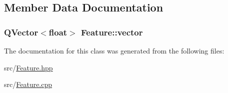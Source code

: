 \subsection{Member Data Documentation}
\hypertarget{class_feature_a8158dfca752942aeb84f35c363184d95}{
\subsubsection[{vector}]{\setlength{\rightskip}{0pt plus 5cm}Q\+Vector$<$float$>$ Feature\+::vector\hspace{0.3cm}{\ttfamily [private]}}}\label{class_feature_a8158dfca752942aeb84f35c363184d95}


The documentation for this class was generated from the following files\+:\begin{DoxyCompactItemize}
\item 
src/\hyperlink{_feature_8hpp}{Feature.\+hpp}\item 
src/\hyperlink{_feature_8cpp}{Feature.\+cpp}\end{DoxyCompactItemize}
